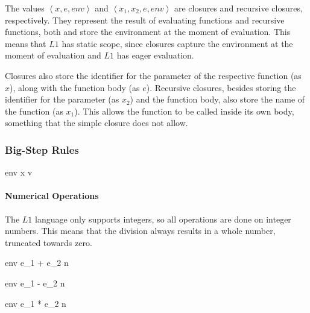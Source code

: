 \documentclass{article}
\begin{document}
\bigskip

The values $\left\langle x, e, env\right\rangle$ and $\left\langle x_1, x_2, e, env\right\rangle$ are closures and recursive closures, respectively.
They represent the result of evaluating functions and recursive functions, both and store the environment at the moment of evaluation.
This means that $L1$ has static scope, since closures capture the environment at the moment of evaluation and $L1$ has eager evaluation.

Closures also store the identifier for the parameter of the respective function (as $x$), along with the function body (as $e$).
Recursive closures, besides storing the identifier for the parameter (as $x_2$) and the function body, also store the name of the function (as $x_1$).
This allows the function to be called inside its own body, something that the simple closure does not allow.

\subsubsection{Big-Step Rules}

    
    

    {\mbox{env} \vdash x \Downarrow v}
    
\paragraph{Numerical Operations}
The $L1$ language only supports integers, so all operations are done on integer numbers.
This means that the division always results in a whole number, truncated towards zero.

\medskip

    {\mbox{env} \vdash e_1 + e_2 \Downarrow n}
    
    {\mbox{env} \vdash e_1 - e_2 \Downarrow n}
    
    {\mbox{env} \vdash e_1 * e_2 \Downarrow n}
    
\end{document}
